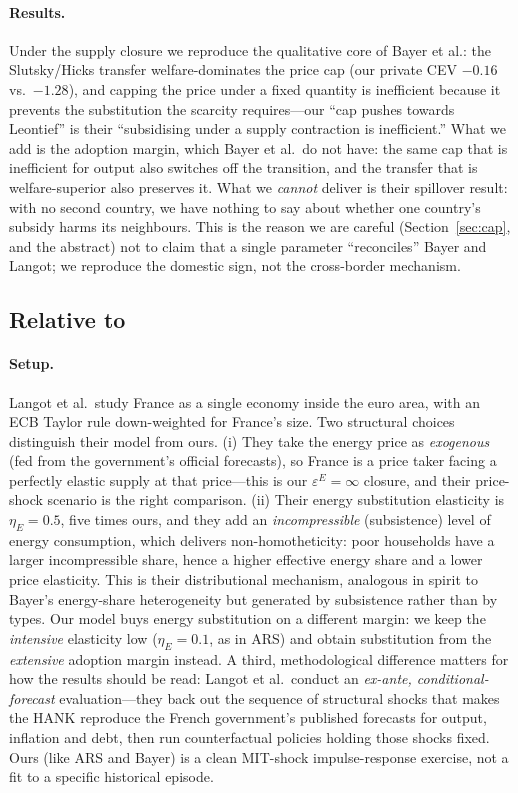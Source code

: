 \documentclass[11pt,a4paper]{article}
\begin{document}
\paragraph{Results.} Under the supply closure we reproduce the qualitative
core of Bayer et al.: the Slutsky/Hicks transfer welfare-dominates the price
cap (our private CEV $-0.16$ vs.\ $-1.28$), and capping the price under a fixed
quantity is inefficient because it prevents the substitution the scarcity
requires---our ``cap pushes towards Leontief'' is their ``subsidising under a
supply contraction is inefficient.'' What we add is the adoption margin, which
Bayer et al.\ do not have: the same cap that is inefficient for output also
switches off the transition, and the transfer that is welfare-superior also
preserves it. What we \emph{cannot} deliver is their spillover result: with no
second country, we have nothing to say about whether one country's subsidy
harms its neighbours. This is the reason we are careful (Section~\ref{sec:cap}, and the
abstract) not to claim that a single parameter ``reconciles'' Bayer and Langot;
we reproduce the domestic sign, not the cross-border mechanism.

\subsection{Relative to \citet{Langot2026}}

\paragraph{Setup.} Langot et al.\ study France as a single economy inside the
euro area, with an ECB Taylor rule down-weighted for France's size. Two
structural choices distinguish their model from ours. (i) They take the energy
price as \emph{exogenous} (fed from the government's official forecasts), so
France is a price taker facing a perfectly elastic supply at that price---this
is our $\varepsilon^E=\infty$ closure, and their price-shock scenario is the
right comparison. (ii) Their energy substitution elasticity is $\eta_E=0.5$,
five times ours, and they add an \emph{incompressible} (subsistence) level of
energy consumption, which delivers non-homotheticity: poor households have a
larger incompressible share, hence a higher effective energy share and a lower
price elasticity. This is their distributional mechanism, analogous in spirit
to Bayer's energy-share heterogeneity but generated by subsistence rather than
by types. Our model buys energy substitution on a different margin: we keep the
\emph{intensive} elasticity low ($\eta_E=0.1$, as in ARS) and obtain
substitution from the \emph{extensive} adoption margin instead. A third,
methodological difference matters for how the results should be read: Langot et
al.\ conduct an \emph{ex-ante, conditional-forecast} evaluation---they back out
the sequence of structural shocks that makes the HANK reproduce the French
government's published forecasts for output, inflation and debt, then run
counterfactual policies holding those shocks fixed. Ours (like ARS and Bayer)
is a clean MIT-shock impulse-response exercise, not a fit to a specific
historical episode.
\end{document}

